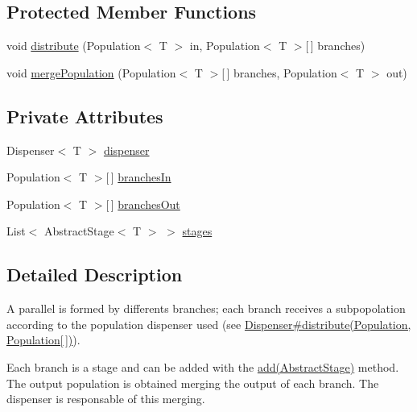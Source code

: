 \subsection*{Protected Member Functions}
\begin{DoxyCompactItemize}
\item 
void \hyperlink{classjenes_1_1stage_1_1_parallel_3_01_t_01extends_01_chromosome_01_4_aafb82610de353045546319738543fab9}{distribute} (Population$<$ T $>$ in, Population$<$ T $>$\mbox{[}$\,$\mbox{]} branches)
\item 
void \hyperlink{classjenes_1_1stage_1_1_parallel_3_01_t_01extends_01_chromosome_01_4_a9cd26799d837f1e1f5ddfcabd0d18aaa}{merge\-Population} (Population$<$ T $>$\mbox{[}$\,$\mbox{]} branches, Population$<$ T $>$ out)
\end{DoxyCompactItemize}
\subsection*{Private Attributes}
\begin{DoxyCompactItemize}
\item 
Dispenser$<$ T $>$ \hyperlink{classjenes_1_1stage_1_1_parallel_3_01_t_01extends_01_chromosome_01_4_a65e70bc6dd645a250f0f0d41c36061c9}{dispenser}
\item 
Population$<$ T $>$\mbox{[}$\,$\mbox{]} \hyperlink{classjenes_1_1stage_1_1_parallel_3_01_t_01extends_01_chromosome_01_4_a5745695a937bdcbb1090bcac60cd7dd4}{branches\-In}
\item 
Population$<$ T $>$\mbox{[}$\,$\mbox{]} \hyperlink{classjenes_1_1stage_1_1_parallel_3_01_t_01extends_01_chromosome_01_4_acdcebb561ac787a51ec7c535e6345c7d}{branches\-Out}
\item 
List$<$ Abstract\-Stage$<$ T $>$ $>$ \hyperlink{classjenes_1_1stage_1_1_parallel_3_01_t_01extends_01_chromosome_01_4_a4a31a724db62564311c6ab6c0c6a8037}{stages}
\end{DoxyCompactItemize}


\subsection{Detailed Description}
A parallel is formed by differents branches; each branch receives a subpopolation according to the population dispenser used (see \hyperlink{}{Dispenser\#distribute(\-Population, Population\mbox{[}$\,$\mbox{]})}).\par
 

Each branch is a stage and can be added with the \hyperlink{}{add(\-Abstract\-Stage)} method. The output population is obtained merging the output of each branch. The dispenser is responsable of this merging. 


